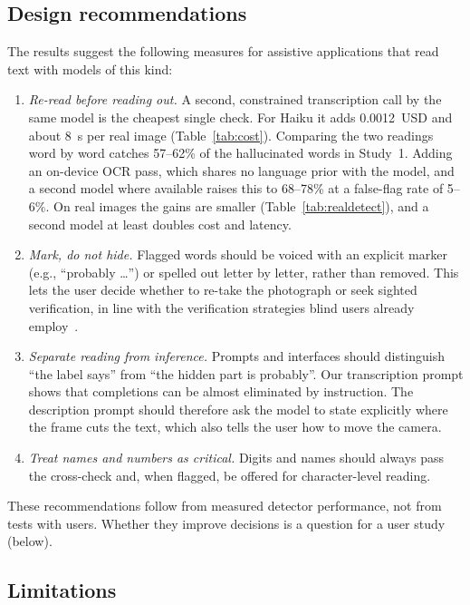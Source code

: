 \documentclass[pdflatex,sn-mathphys-num]{sn-jnl}%
\theoremstyle{thmstyleone}%
\theoremstyle{thmstyletwo}%
\theoremstyle{thmstylethree}%
\newcommand{\RangeRereadRec}{57--62}
\newcommand{\RangeRuleFf}{5--6}
\newcommand{\RangeRuleRec}{68--78}
\newcommand{\RealCostHaikuTrans}{0.0012}
\newcommand{\RealCostHaikuTransSec}{8}
\begin{document}
\subsection{Design recommendations}

The results suggest the following measures for assistive applications that read text with models of this kind:
\begin{enumerate}
\item \emph{Re-read before reading out.} A second, constrained transcription call by the same model is the cheapest single check. For Haiku it adds \RealCostHaikuTrans{}~USD and about \RealCostHaikuTransSec{}~s per real image (Table~\ref{tab:cost}). Comparing the two readings word by word catches \RangeRereadRec\% of the hallucinated words in Study~1. Adding an on-device OCR pass, which shares no language prior with the model, and a second model where available raises this to \RangeRuleRec\% at a false-flag rate of \RangeRuleFf\%. On real images the gains are smaller (Table~\ref{tab:realdetect}), and a second model at least doubles cost and latency.
\item \emph{Mark, do not hide.} Flagged words should be voiced with an explicit marker (e.g., ``probably \ldots'') or spelled out letter by letter, rather than removed. This lets the user decide whether to re-take the photograph or seek sighted verification, in line with the verification strategies blind users already employ~\cite{alharbi2024misfitting,xie2025beyond}.
\item \emph{Separate reading from inference.} Prompts and interfaces should distinguish ``the label says'' from ``the hidden part is probably''. Our transcription prompt shows that completions can be almost eliminated by instruction. The description prompt should therefore ask the model to state explicitly where the frame cuts the text, which also tells the user how to move the camera.
\item \emph{Treat names and numbers as critical.} Digits and names should always pass the cross-check and, when flagged, be offered for character-level reading.
\end{enumerate}
These recommendations follow from measured detector performance, not from tests with users. Whether they improve decisions is a question for a user study (below).

\subsection{Limitations}
\end{document}

